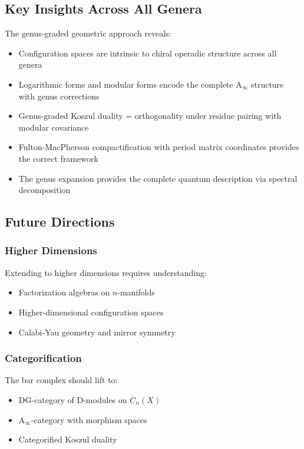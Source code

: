 \subsection{Key Insights Across All Genera}
 
The genus-graded geometric approach reveals:
\begin{itemize}
\item Configuration spaces are intrinsic to chiral operadic structure across all genera
\item Logarithmic forms and modular forms encode the complete A$_\infty$ structure with genus corrections
\item Genus-graded Koszul duality = orthogonality under residue pairing with modular covariance
\item Fulton-MacPherson compactification with period matrix coordinates provides the correct framework
\item The genus expansion provides the complete quantum description via spectral decomposition
\end{itemize}
 
\subsection{Future Directions}
 
\subsubsection{Higher Dimensions}
Extending to higher dimensions requires understanding:
\begin{itemize}
\item Factorization algebras on $n$-manifolds
\item Higher-dimensional configuration spaces
\item Calabi-Yau geometry and mirror symmetry
\end{itemize}
 
\subsubsection{Categorification}
The bar complex should lift to:
\begin{itemize}
\item DG-category of D-modules on $\overline{C}_n(X)$
\item A$_\infty$-category with morphism spaces
\item Categorified Koszul duality
\end{itemize}
 
